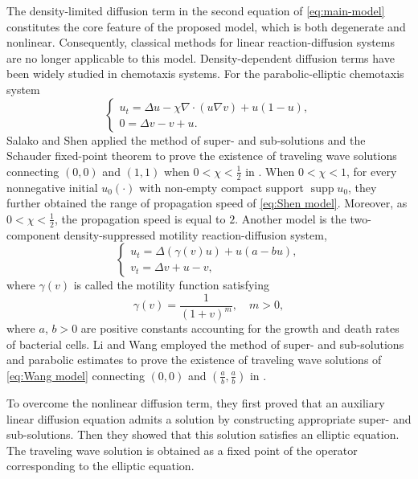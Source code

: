 \documentclass[preprint,sort&compress,final,12pt]{elsarticle}
\numberwithin{equation}{section}
\begin{document}
The density-limited diffusion term in the second equation of \eqref{eq:main-model} constitutes the core feature of the proposed model, which is both degenerate and nonlinear. Consequently, classical methods for linear reaction-diffusion systems are no longer applicable to this model. Density-dependent diffusion terms have been widely studied in chemotaxis systems. For the parabolic-elliptic chemotaxis system
\begin{equation}\label{eq:Shen model}
\left\{\begin{array}{ll}
u_t={\Delta u}-\chi \nabla \cdot (u\nabla v)+u(1-u),\\[0.2cm]
0={\Delta v}-v+u.
\end{array}\right.
\end{equation}
Salako and Shen applied the method of super- and sub-solutions and the Schauder fixed-point theorem to prove the existence of traveling wave solutions connecting $(0,0)$ and $(1,1)$ when $0<\chi<\frac{1}{2}$ in \cite{Salako Shen 2017 DCDSB}. When $0<\chi<1$, for every nonnegative initial $u_0(\cdot)$ 
with non-empty compact support $\operatorname{supp} u_0$, they further obtained the range of propagation speed of \eqref{eq:Shen model}. Moreover, as $0<\chi<\frac{1}{2}$, the propagation speed is equal to $2$. Another model is the two-component density-suppressed motility reaction-diffusion system,
\begin{equation}\label{eq:Wang model}
\left\{\begin{array}{ll}
u_t=\Delta(\gamma(v)u)+u(a-bu),\\[0.2cm]
v_t=\Delta v+u-v,
\end{array}\right.
\end{equation}
where $\gamma(v)$ is called the motility function satisfying
\begin{equation*}
\gamma(v)=\frac{1}{(1+v)^m},\quad m>0,
\end{equation*}
where $a$, $b>0$ are positive constants accounting for the growth and death rates of bacterial cells. Li and Wang employed the method of super- and sub-solutions and parabolic estimates to prove the existence of traveling wave solutions of \eqref{eq:Wang model} connecting $(0,0)$ and $(\frac{a}{b},\frac{a}{b})$ in \cite{2021 Lijing wangzhian}. 

To overcome the nonlinear diffusion term, they first proved that an auxiliary linear diffusion equation admits a solution by constructing appropriate super- and sub-solutions. Then they showed that this solution satisfies an elliptic equation. The traveling wave solution is obtained as a fixed point of the operator corresponding to the elliptic equation.
\end{document}
